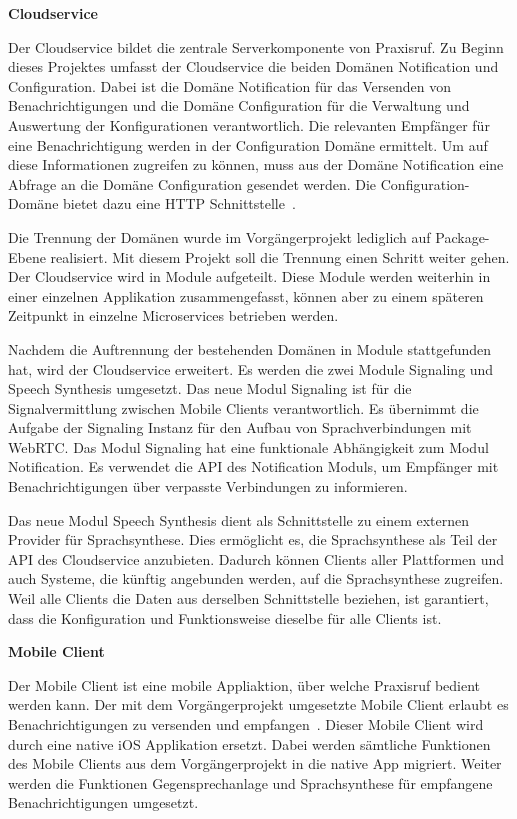 \textbf{Cloudservice}

Der Cloudservice bildet die zentrale Serverkomponente von Praxisruf.
Zu Beginn dieses Projektes umfasst der Cloudservice die beiden Domänen Notification und Configuration.
Dabei ist die Domäne Notification für das Versenden von Benachrichtigungen und die Domäne Configuration für die Verwaltung und Auswertung der Konfigurationen verantwortlich.
Die relevanten Empfänger für eine Benachrichtigung werden in der Configuration Domäne ermittelt.
Um auf diese Informationen zugreifen zu können, muss aus der Domäne Notification eine Abfrage an die Domäne Configuration gesendet werden.
Die Configuration-Domäne bietet dazu eine HTTP Schnittstelle~\cite{ip5}.

Die Trennung der Domänen wurde im Vorgängerprojekt lediglich auf Package-Ebene realisiert.
Mit diesem Projekt soll die Trennung einen Schritt weiter gehen.
Der Cloudservice wird in Module aufgeteilt.
Diese Module werden weiterhin in einer einzelnen Applikation zusammengefasst, können aber zu einem späteren Zeitpunkt in einzelne Microservices betrieben werden.

Nachdem die Auftrennung der bestehenden Domänen in Module stattgefunden hat, wird der Cloudservice erweitert.
Es werden die zwei Module Signaling und Speech Synthesis umgesetzt.
Das neue Modul Signaling ist für die Signalvermittlung zwischen Mobile Clients verantwortlich.
Es übernimmt die Aufgabe der Signaling Instanz für den Aufbau von Sprachverbindungen mit WebRTC.
Das Modul Signaling hat eine funktionale Abhängigkeit zum Modul Notification.
Es verwendet die API des Notification Moduls, um Empfänger mit Benachrichtigungen über verpasste Verbindungen zu informieren.

Das neue Modul Speech Synthesis dient als Schnittstelle zu einem externen Provider für Sprachsynthese.
Dies ermöglicht es, die Sprachsynthese als Teil der API des Cloudservice anzubieten.
Dadurch können Clients aller Plattformen und auch Systeme, die künftig angebunden werden, auf die Sprachsynthese zugreifen.
Weil alle Clients die Daten aus derselben Schnittstelle beziehen, ist garantiert, dass die Konfiguration und Funktionsweise dieselbe für alle Clients ist.

\textbf{Mobile Client}

Der Mobile Client ist eine mobile Appliaktion, über welche Praxisruf bedient werden kann.
Der mit dem Vorgängerprojekt umgesetzte Mobile Client erlaubt es Benachrichtigungen zu versenden und empfangen~\cite{ip5}.
Dieser Mobile Client wird durch eine native iOS Applikation ersetzt.
Dabei werden sämtliche Funktionen des Mobile Clients aus dem Vorgängerprojekt in die native App migriert.
Weiter werden die Funktionen Gegensprechanlage und Sprachsynthese für empfangene Benachrichtigungen umgesetzt.

